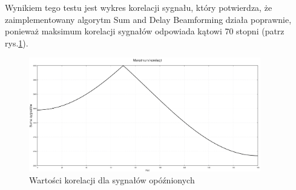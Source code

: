 \documentclass[eng,printmode]{mgr}
\begin{document}
Wynikiem tego testu jest wykres korelacji sygnału, który potwierdza, że zaimplementowany algorytm Sum and Delay Beamforming działa poprawnie, ponieważ maksimum korelacji sygnałów odpowiada kątowi 70 stopni (patrz rys.\ref{fig-korelacja}). \cite{adnote1}

\begin{figure}[!ht]

    \centering

  \includegraphics[width=0.9\textwidth, angle=0]{suma_opoznienie.png}

    \caption{Wartości korelacji dla sygnałów opóźnionych}
 \label{fig-korelacja}
    

\end{figure}
\end{document}
